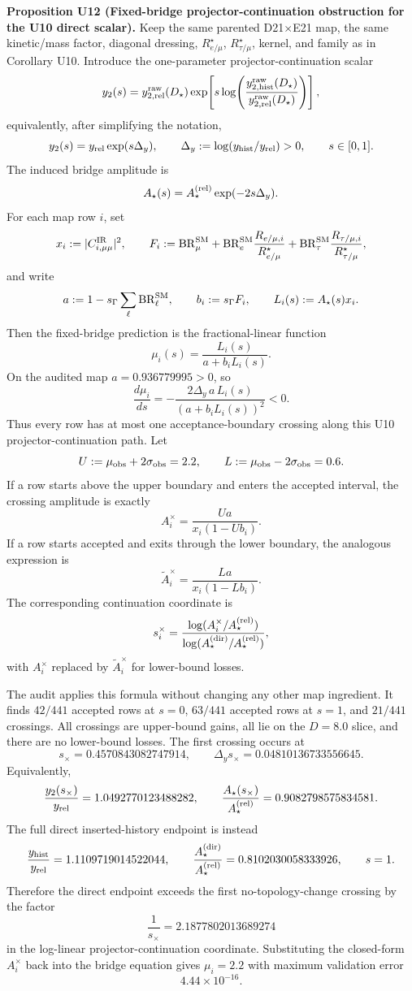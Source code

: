 \documentclass[aps,prd,onecolumn,notitlepage,nofootinbib,superscriptaddress,11pt,floatfix]{revtex4-2}
\begin{document}
\medskip\noindent\textbf{Proposition U12 (Fixed-bridge projector-continuation obstruction for the U10 direct scalar).}
Keep the same parented D21\(\times\)E21 map, the same kinetic/mass factor, diagonal dressing, \(R_{e/\mu}^\star\), \(R_{\tau/\mu}^\star\), kernel, and family as in Corollary U10.  Introduce the one-parameter projector-continuation scalar
\[
y_2(s)=y_{2,{\rm rel}}^{\rm raw}(D_\star)
\exp\!\left[
s\log\!\left(
\frac{y_{2,{\rm hist}}^{\rm raw}(D_\star)}
     {y_{2,{\rm rel}}^{\rm raw}(D_\star)}
\right)
\right],
\]
equivalently, after simplifying the notation,
\[
y_2(s)=y_{\rm rel}\exp(s\Delta_y),
\qquad
\Delta_y:=\log(y_{\rm hist}/y_{\rm rel})>0,
\qquad
s\in[0,1].
\]
The induced bridge amplitude is
\[
A_\star(s)=A_\star^{\rm(rel)}\exp(-2s\Delta_y).
\]
For each map row \(i\), set
\[
x_i:=|C_{i,\mu\mu}^{\rm IR}|^2,\qquad
F_i:=
\mathrm{BR}_\mu^{\rm SM}
+\mathrm{BR}_e^{\rm SM}\frac{R_{e/\mu,i}}{R_{e/\mu}^\star}
+\mathrm{BR}_\tau^{\rm SM}\frac{R_{\tau/\mu,i}}{R_{\tau/\mu}^\star},
\]
and write
\[
a:=1-s_\Gamma\sum_\ell \mathrm{BR}_\ell^{\rm SM},
\qquad
b_i:=s_\Gamma F_i,
\qquad
L_i(s):=A_\star(s)x_i.
\]
Then the fixed-bridge prediction is the fractional-linear function
\[
\mu_i(s)=\frac{L_i(s)}{a+b_iL_i(s)}.
\]
On the audited map \(a=0.936779995>0\), so
\[
\frac{d\mu_i}{ds}
=
-\frac{2\Delta_y\,a\,L_i(s)}
       {(a+b_iL_i(s))^2}
<0.
\]
Thus every row has at most one acceptance-boundary crossing along this U10 projector-continuation path.  Let
\[
U:=\mu_{\rm obs}+2\sigma_{\rm obs}=2.2,
\qquad
L:=\mu_{\rm obs}-2\sigma_{\rm obs}=0.6.
\]
If a row starts above the upper boundary and enters the accepted interval, the crossing amplitude is exactly
\[
A_i^\times
=
\frac{Ua}{x_i(1-Ub_i)}.
\]
If a row starts accepted and exits through the lower boundary, the analogous expression is
\[
\widetilde A_i^\times
=
\frac{La}{x_i(1-Lb_i)}.
\]
The corresponding continuation coordinate is
\[
s_i^\times
=
\frac{\log(A_i^\times/A_\star^{\rm(rel)})}
       {\log(A_\star^{\rm(dir)}/A_\star^{\rm(rel)})},
\]
with \(A_i^\times\) replaced by \(\widetilde A_i^\times\) for lower-bound losses.

The audit
applies this formula without changing any other map ingredient.  It finds \(42/441\) accepted rows at \(s=0\), \(63/441\) accepted rows at \(s=1\), and \(21/441\) crossings.  All crossings are upper-bound gains, all lie on the \(D=8.0\) slice, and there are no lower-bound losses.  The first crossing occurs at
\[
s_\times=0.4570843082747914,
\qquad
\Delta_y s_\times=0.04810136733556645.
\]
Equivalently,
\[
\frac{y_2(s_\times)}{y_{\rm rel}}=1.0492770123488282,
\qquad
\frac{A_\star(s_\times)}{A_\star^{\rm(rel)}}=0.9082798575834581.
\]
The full direct inserted-history endpoint is instead
\[
\frac{y_{\rm hist}}{y_{\rm rel}}=1.1109719014522044,
\qquad
\frac{A_\star^{\rm(dir)}}{A_\star^{\rm(rel)}}=0.8102030058333926,
\qquad
s=1.
\]
Therefore the direct endpoint exceeds the first no-topology-change crossing by the factor
\[
\frac{1}{s_\times}=2.1877802013689274
\]
in the log-linear projector-continuation coordinate.  Substituting the closed-form \(A_i^\times\) back into the bridge equation gives \(\mu_i=2.2\) with maximum validation error
\[
4.44\times10^{-16}.
\]
\end{document}

